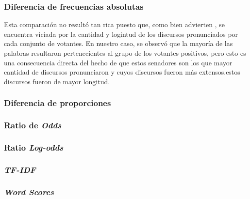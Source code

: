 \subsubsection{Diferencia de frecuencias absolutas}
Esta comparaci\'on no result\'o tan rica puesto que, como bien advierten
\cite{monroe2008fightin}, se encuentra viciada por la cantidad y logintud
de los discursos pronunciados por cada conjunto de votantes. En nuestro caso,
se observ\'o que la mayor\'ia de las palabras resultaron pertenecientes al grupo
de los votantes positivos, pero esto es una consecuencia directa del hecho
de que estos senadores son los que mayor cantidad de discursos pronunciaron y
cuyos discursos fueron m\'as extensos.estos discursos fueron de mayor
longitud.

\subsubsection{Diferencia de proporciones}

\subsubsection{Ratio de \textit{Odds}}

\subsubsection{Ratio \textit{Log-odds}}

\subsubsection{\textit{TF-IDF}}

\subsubsection{\textit{Word Scores}}